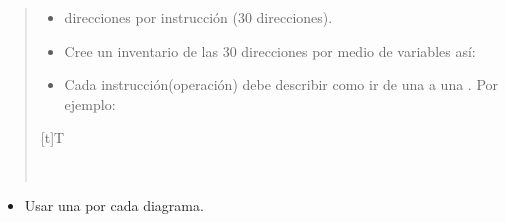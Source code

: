 \documentclass[letterpaper,10pt,spanish]{sphinxmanual}
\let\sphinxpxdimen\pdfpxdimen\else\newdimen\sphinxpxdimen
\begin{document}
\begin{enumerate}
\begin{quote}
\begin{itemize}
\item {} 
 direcciones por instrucción (30 direcciones).

\item {} 
\sphinxAtStartPar
Cree un inventario de las 30 direcciones por medio de variables así:

\begin{sphinxVerbatim}[commandchars=\\\{\}]



\end{sphinxVerbatim}

\item {} 
\sphinxAtStartPar
Cada instrucción(operación) debe describir como ir de una  a una . Por ejemplo:

\end{itemize}


\begin{savenotes}\sphinxattablestart
\sphinxthistablewithglobalstyle
\centering
\begin{tabulary}{\linewidth}[t]{T}
\sphinxtoprule
\sphinxtableatstartofbodyhook

\begin{sphinxfigure-in-table}
\centering
\capstart
\noindent\sphinxincludegraphics[width=700\sphinxpxdimen]{{image052}.png}
\label{\detokenize{cursos/ofimatica11/periodo01/G02:id2}}\end{sphinxfigure-in-table}\relax
\\
\sphinxbottomrule
\end{tabulary}
\sphinxtableafterendhook\par
\sphinxattableend\end{savenotes}
\end{quote}
\begin{itemize}
\item {} 
\sphinxAtStartPar
Usar una  por cada diagrama.


\end{itemize}
\end{enumerate}
\end{document}
